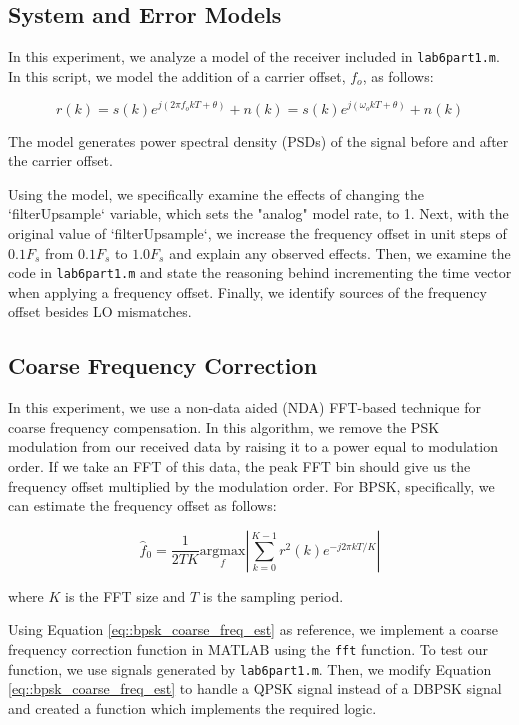\documentclass{article}
\begin{document}
\subsection{System and Error Models}

In this experiment, we analyze a model of the receiver included in \texttt{lab6part1.m}. In this script, we model the addition of a carrier offset, $f_o$, as follows:

\begin{equation}
	r(k) = s(k)e^{j(2{\pi}f_okT+\theta)}+n(k) = s(k)e^{j(\omega_okT+\theta)}+n(k)
\end{equation}

\noindent The model generates power spectral density (PSDs) of the signal before and after the carrier offset.

Using the model, we specifically examine the effects of changing the `filterUpsample` variable, which sets the "analog" model rate, to 1. Next, with the original value of `filterUpsample`, we increase the frequency offset in unit steps of $0.1F_s$ from $0.1F_s$ to $1.0F_s$ and explain any observed effects. Then, we examine the code in \texttt{lab6part1.m} and state the reasoning behind incrementing the time vector when applying a frequency offset. Finally, we identify sources of the frequency offset besides LO mismatches.

\subsection{Coarse Frequency Correction}

In this experiment, we use a non-data aided (NDA) FFT-based technique for coarse frequency compensation. In this algorithm, we remove the PSK modulation from our received data by raising it to a power equal to modulation order. If we take an FFT of this data, the peak FFT bin should give us the frequency offset multiplied by the modulation order. For BPSK, specifically, we can estimate the frequency offset as follows:

\begin{equation}
	\label{eq::bpsk_coarse_freq_est}	
	\hat{f}_0 = \frac{1}{2TK}\underset{f}{\text{argmax}}\left\vert\sum_{k=0}^{K-1}{r^2(k)e^{-j2{\pi}kT/K}}\right\vert
\end{equation}

\noindent where $K$ is the FFT size and $T$ is the sampling period.

Using Equation \ref{eq::bpsk_coarse_freq_est} as reference, we implement a coarse frequency correction function in MATLAB using the \texttt{fft} function. To test our function, we use signals generated by \texttt{lab6part1.m}. Then, we modify Equation \ref{eq::bpsk_coarse_freq_est} to handle a QPSK signal instead of a DBPSK signal and created a function which implements the required logic.
\end{document}
